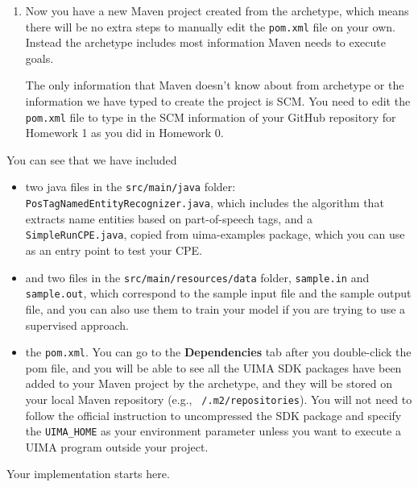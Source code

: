 \begin{enumerate}
\item Now you have a new Maven project created from the archetype, which means
there will be no extra steps to manually edit the \verb|pom.xml| file on your
own. Instead the archetype includes most information Maven needs to execute
goals.

The only information that Maven doesn't know about from archetype or the
information we have typed to create the project is SCM. You need to edit the
\texttt{pom.xml} file to type in the SCM information of your GitHub repository
for Homework 1 as you did in Homework 0.

\end{enumerate}

You can see that we have included

\begin{itemize}

\item two java files in the \texttt{src/main/java} folder:
\texttt{PosTagNamedEntityRecognizer.java}, which includes the algorithm that
extracts name entities based on part-of-speech tags, and a
\texttt{SimpleRunCPE.java}, copied from uima-examples package, which you can use
as an entry point to test your CPE.

\item and two files in the \texttt{src/main/resources/data} folder,
\texttt{sample.in} and \texttt{sample.out}, which correspond to the sample input
file and the sample output file, and you can also use them to train your model
if you are trying to use a supervised approach.

\item the \texttt{pom.xml}. You can go to the \textbf{Dependencies} tab after
you double-click the pom file, and you will be able to see all the UIMA SDK
packages have been added to your Maven project by the archetype, and they will
be stored on your local Maven repository (e.g., \texttt{~/.m2/repositories}).
You will not need to follow the official instruction to uncompressed the SDK
package and specify the \verb|UIMA_HOME| as your environment parameter unless
you want to execute a UIMA program outside your project.

\end{itemize}

Your implementation starts here.

